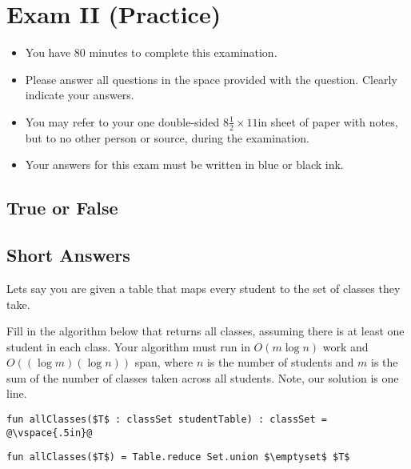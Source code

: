 \chapter{Exam II (Practice)}
\label{ch:examii-practice}

\begin{preamble}
\begin{itemize}
\item You have 80 minutes to complete this examination.
\item Please answer all questions in the space provided with the
  question.  Clearly indicate your answers.
\item You may refer to your one double-sided $8\frac{1}{2} \times 11$in
  sheet of paper with notes, but to no other person or source, during the
  examination.

\item Your answers for this exam must be written in blue or black ink.

\end{itemize}
\end{preamble}


\section[10]{True or False}
%



\section{Short Answers}

%
\begin{problem}[4p][Classes]

Lets say you are given a table that maps every student to the set of
classes they take.  

\ask
Fill in the algorithm below that returns all classes,
assuming there is at least one student in each class.  Your algorithm
must run in $O(m \log n)$ work and $O((\log m)(\log n))$ span, where
$n$ is the number of students and $m$ is the sum of the number of
classes taken across all students.    Note, our solution is one line.

\begin{lstlisting}[numbers=none]
fun allClasses($T$ : classSet studentTable) : classSet = 
@\vspace{.5in}@
\end{lstlisting}

\sol
\begin{lstlisting}[numbers=none]
fun allClasses($T$) = Table.reduce Set.union $\emptyset$ $T$
\end{lstlisting}
\end{problem}


